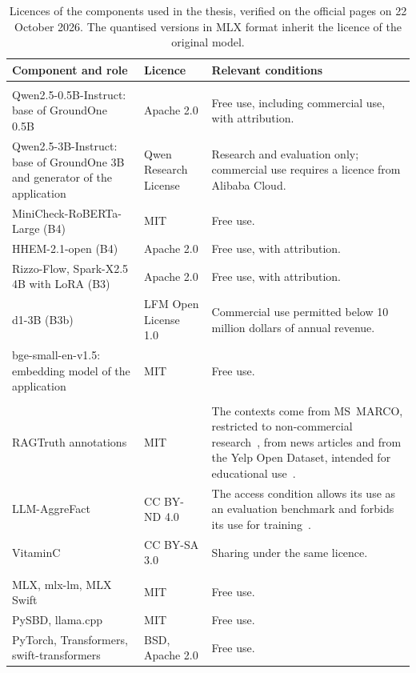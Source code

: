 \begin{table}[htbp]
\centering
\caption{Licences of the components used in the thesis, verified on the official pages on 22 October 2026. The
quantised versions in MLX format inherit the licence of the original model.}
\label{tab:setup-licences}
\small
\begin{tabularx}{\textwidth}{@{}>{\raggedright\arraybackslash}p{}>{\raggedright\arraybackslash}p{}>{\raggedright\arraybackslash}X@{}}
\toprule
Component and role & Licence & Relevant conditions \\
\midrule
\multicolumn{3}{@{}l}{\textit{Models}} \\
Qwen2.5-0.5B-Instruct: base of GroundOne 0.5B & Apache 2.0 & Free use, including commercial use, with attribution. \\ \addlinespace[2pt]
Qwen2.5-3B-Instruct: base of GroundOne 3B and generator of the application & Qwen Research License~\cite{qwen2024researchlicense} & Research and evaluation only; commercial use requires a licence from Alibaba Cloud. \\ \addlinespace[2pt]
MiniCheck-RoBERTa-Large (B4) & MIT & Free use. \\ \addlinespace[2pt]
HHEM-2.1-open (B4) & Apache 2.0 & Free use, with attribution. \\ \addlinespace[2pt]
Rizzo-Flow, Spark-X2.5 4B with LoRA (B3) & Apache 2.0 & Free use, with attribution. \\ \addlinespace[2pt]
d1-3B (B3b) & LFM Open License 1.0~\cite{liquid2025lfmlicense} & Commercial use permitted below 10 million dollars of annual revenue. \\ \addlinespace[2pt]
bge-small-en-v1.5: embedding model of the application & MIT & Free use. \\
\addlinespace
\multicolumn{3}{@{}l}{\textit{Data}} \\
RAGTruth annotations & MIT & The contexts come from MS~MARCO, restricted to non-commercial research~\cite{msmarco2026terms}, from news articles and from the Yelp Open Dataset, intended for educational use~\cite{yelpdataset}. \\ \addlinespace[2pt]
LLM-AggreFact & CC BY-ND 4.0 & The access condition allows its use as an evaluation benchmark and forbids its use for training~\cite{hf_llmaggrefact}. \\ \addlinespace[2pt]
VitaminC & CC BY-SA 3.0 & Sharing under the same licence. \\
\addlinespace
\multicolumn{3}{@{}l}{\textit{Software}} \\
MLX, mlx-lm, MLX Swift & MIT & Free use. \\ \addlinespace[2pt]
PySBD, llama.cpp & MIT & Free use. \\ \addlinespace[2pt]
PyTorch, Transformers, swift-transformers & BSD, Apache 2.0 & Free use. \\
\bottomrule
\end{tabularx}
\end{table}

